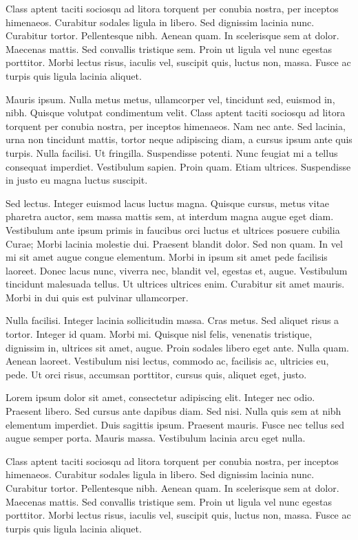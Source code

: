 Class aptent taciti sociosqu ad litora torquent per conubia nostra, per
inceptos himenaeos. Curabitur sodales ligula in libero. Sed dignissim
lacinia nunc. Curabitur tortor. Pellentesque nibh. Aenean quam. In
scelerisque sem at dolor. Maecenas mattis. Sed convallis tristique sem.
Proin ut ligula vel nunc egestas porttitor. Morbi lectus risus, iaculis
vel, suscipit quis, luctus non, massa. Fusce ac turpis quis ligula
lacinia aliquet.

Mauris ipsum. Nulla metus metus, ullamcorper vel, tincidunt sed, euismod
in, nibh. Quisque volutpat condimentum velit. Class aptent taciti
sociosqu ad litora torquent per conubia nostra, per inceptos himenaeos.
Nam nec ante. Sed lacinia, urna non tincidunt mattis, tortor neque
adipiscing diam, a cursus ipsum ante quis turpis. Nulla facilisi. Ut
fringilla. Suspendisse potenti. Nunc feugiat mi a tellus consequat
imperdiet. Vestibulum sapien. Proin quam. Etiam ultrices. Suspendisse in
justo eu magna luctus suscipit.

Sed lectus. Integer euismod lacus luctus magna. Quisque cursus, metus
vitae pharetra auctor, sem massa mattis sem, at interdum magna augue
eget diam. Vestibulum ante ipsum primis in faucibus orci luctus et
ultrices posuere cubilia Curae; Morbi lacinia molestie dui. Praesent
blandit dolor. Sed non quam. In vel mi sit amet augue congue elementum.
Morbi in ipsum sit amet pede facilisis laoreet. Donec lacus nunc,
viverra nec, blandit vel, egestas et, augue. Vestibulum tincidunt
malesuada tellus. Ut ultrices ultrices enim. Curabitur sit amet mauris.
Morbi in dui quis est pulvinar ullamcorper.

Nulla facilisi. Integer lacinia sollicitudin massa. Cras metus. Sed
aliquet risus a tortor. Integer id quam. Morbi mi. Quisque nisl felis,
venenatis tristique, dignissim in, ultrices sit amet, augue. Proin
sodales libero eget ante. Nulla quam. Aenean laoreet. Vestibulum nisi
lectus, commodo ac, facilisis ac, ultricies eu, pede. Ut orci risus,
accumsan porttitor, cursus quis, aliquet eget, justo.

Lorem ipsum dolor sit amet, consectetur adipiscing elit. Integer nec
odio. Praesent libero. Sed cursus ante dapibus diam. Sed nisi. Nulla
quis sem at nibh elementum imperdiet. Duis sagittis ipsum. Praesent
mauris. Fusce nec tellus sed augue semper porta. Mauris massa.
Vestibulum lacinia arcu eget nulla.

Class aptent taciti sociosqu ad litora torquent per conubia nostra, per
inceptos himenaeos. Curabitur sodales ligula in libero. Sed dignissim
lacinia nunc. Curabitur tortor. Pellentesque nibh. Aenean quam. In
scelerisque sem at dolor. Maecenas mattis. Sed convallis tristique sem.
Proin ut ligula vel nunc egestas porttitor. Morbi lectus risus, iaculis
vel, suscipit quis, luctus non, massa. Fusce ac turpis quis ligula
lacinia aliquet.

